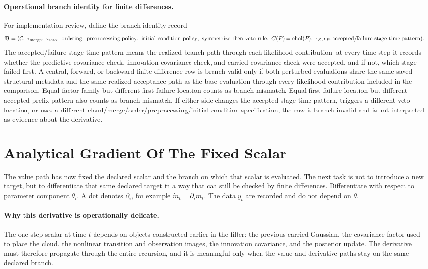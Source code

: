 \documentclass[11pt]{article}
\numberwithin{equation}{section}
\newcommand{\chol}{\operatorname{chol}}
\begin{document}
\paragraph{Operational branch identity for finite differences.}
For implementation review, define the branch-identity record
\begin{equation}
  \mathfrak B
  =
  (\mathcal C,\ \tau_{\rm merge},\ \tau_{\rm zero},\ \text{ordering},\
   \text{preprocessing policy},\ \text{initial-condition policy},\
   \text{symmetrize-then-veto rule},\ C(P)=\chol(P),\ \epsilon_S,\epsilon_P,
   \text{accepted/failure stage-time pattern}).
  \label{eq:p32-branch-identity-record}
\end{equation}
The accepted/failure stage-time pattern means the realized branch path through
each likelihood contribution: at every time step it records whether the
predictive covariance check, innovation covariance check, and carried-covariance
check were accepted, and if not, which stage failed first.  A central, forward,
or backward finite-difference row is branch-valid only if both perturbed
evaluations share the same saved structural metadata and the same realized
acceptance path as the base evaluation through every likelihood contribution
included in the comparison.  Equal factor family but different first failure
location counts as branch mismatch.  Equal first failure location but different
accepted-prefix pattern also counts as branch mismatch.  If either side changes
the accepted stage-time pattern, triggers a different veto location, or uses a
different cloud/merge/order/preprocessing/initial-condition specification, the
row is branch-invalid and is not interpreted as evidence about the derivative.

\section{Analytical Gradient Of The Fixed Scalar}
\label{sec:p31-gradient}

The value path has now fixed the declared scalar and the branch on which that
scalar is evaluated.  The next task is not to introduce a new target, but to
differentiate that same declared target in a way that can still be checked by
finite differences.  Differentiate with respect to parameter component \(\theta_i\).
A dot denotes \(\partial_i\), for example \(\dot m_t=\partial_i m_t\).  The data
\(y_t\) are recorded and do not depend on \(\theta\).

\paragraph{Why this derivative is operationally delicate.}
The one-step scalar at time \(t\) depends on objects constructed earlier in the
filter: the previous carried Gaussian, the covariance factor used to place the
cloud, the nonlinear transition and observation images, the innovation
covariance, and the posterior update.  The derivative must therefore propagate
through the entire recursion, and it is meaningful only when the value and
derivative paths stay on the same declared branch.
\end{document}
